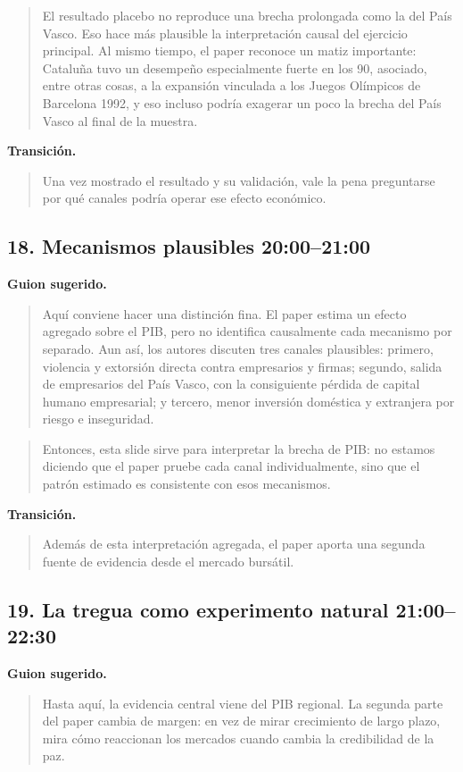 \documentclass[11pt]{article}
\newcommand{\slideentry}[2]{\subsection*{#1 \hfill #2}}
\begin{document}
\begin{quote}
El resultado placebo no reproduce una brecha prolongada como la del País Vasco. Eso hace más plausible la interpretación causal del ejercicio principal. Al mismo tiempo, el paper reconoce un matiz importante: Cataluña tuvo un desempeño especialmente fuerte en los 90, asociado, entre otras cosas, a la expansión vinculada a los Juegos Olímpicos de Barcelona 1992, y eso incluso podría exagerar un poco la brecha del País Vasco al final de la muestra.
\end{quote}

\textbf{Transición.}
\begin{quote}
Una vez mostrado el resultado y su validación, vale la pena preguntarse por qué canales podría operar ese efecto económico.
\end{quote}

\slideentry{18. Mecanismos plausibles}{20:00--21:00}

\textbf{Guion sugerido.}
\begin{quote}
Aquí conviene hacer una distinción fina. El paper estima un efecto agregado sobre el PIB, pero no identifica causalmente cada mecanismo por separado. Aun así, los autores discuten tres canales plausibles: primero, violencia y extorsión directa contra empresarios y firmas; segundo, salida de empresarios del País Vasco, con la consiguiente pérdida de capital humano empresarial; y tercero, menor inversión doméstica y extranjera por riesgo e inseguridad.
\end{quote}

\begin{quote}
Entonces, esta slide sirve para interpretar la brecha de PIB: no estamos diciendo que el paper pruebe cada canal individualmente, sino que el patrón estimado es consistente con esos mecanismos.
\end{quote}

\textbf{Transición.}
\begin{quote}
Además de esta interpretación agregada, el paper aporta una segunda fuente de evidencia desde el mercado bursátil.
\end{quote}

\slideentry{19. La tregua como experimento natural}{21:00--22:30}

\textbf{Guion sugerido.}
\begin{quote}
Hasta aquí, la evidencia central viene del PIB regional. La segunda parte del paper cambia de margen: en vez de mirar crecimiento de largo plazo, mira cómo reaccionan los mercados cuando cambia la credibilidad de la paz.
\end{quote}
\end{document}
